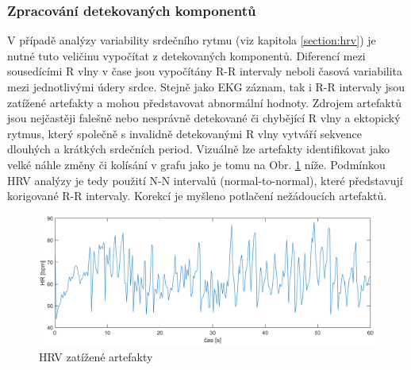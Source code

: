\subsubsection{Zpracování detekovaných komponentů}
\label{section:components_processing}
V případě analýzy variability srdečního rytmu (viz kapitola \ref{section:hrv})
je nutné tuto veličinu vypočítat z detekovaných komponentů. Diferencí mezi
sousedícími R vlny v čase jsou vypočítány R-R intervaly neboli časová
variabilita mezi jednotlivými údery srdce. Stejně jako EKG záznam, tak i R-R
intervaly jsou zatížené artefakty a mohou představovat abnormální hodnoty.
Zdrojem artefaktů jsou nejčastěji falešně nebo nesprávně detekované či chybějící
R vlny a ektopický rytmus, který společně s invalidně detekovanými R vlny
vytváří sekvence dlouhých a krátkých srdečních period. Vizuálně lze artefakty
identifikovat jako velké náhle změny či kolísání v grafu jako je tomu na Obr.
\ref{fig:hrv_artifacts} níže. Podmínkou HRV analýzy je tedy použití N-N
intervalů (normal-to-normal), které představují korigované R-R intervaly.
Korekcí je myšleno potlačení nežádoucích artefaktů.

\begin{figure}[h]
    \begin{center}
        \includegraphics[width=1\textwidth]{../assets/figures/hrv_artifacts}
        \caption{HRV zatížené artefakty}
        \label{fig:hrv_artifacts}
    \end{center}
\end{figure}

